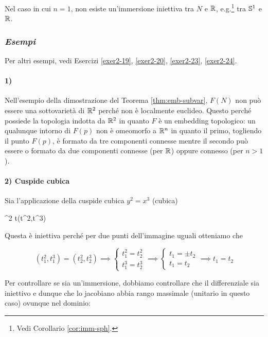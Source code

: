 Nel caso in cui $ n=1 $, non esiste un'immersione iniettiva tra $ N $ e $ \R $, e.g.\footnote{%
	Vedi Corollario \ref{cor:imm-sph}.%
} tra $ \S^{1} $ e $ \R $.

\subsubsection{\textit{Esempi}}

Per altri esempi, vedi Esercizi \ref{exer2-19}, \ref{exer2-20}, \ref{exer2-23}, \ref{exer2-24}.

\paragraph{1)}

Nell'esempio della dimostrazione del Teorema \ref{thm:emb-subvar}, $ F(N) $ non può essere una sottovarietà di $ \R^{2} $ perché non è localmente euclideo. Questo perché possiede la topologia indotta da $ \R^{2} $ in quanto $ F $ è un embedding topologico: un qualunque intorno di $ F(p) $ non è omeomorfo a $ \R^{n} $ in quanto il primo, togliendo il punto $ F(p) $, è formato da tre componenti connesse mentre il secondo può essere o formato da due componenti connesse (per $ \R $) oppure connesso (per $ n > 1 $).

\paragraph{2) Cuspide cubica}

Sia l'applicazione della cuspide cubica $ y^{2} = x^{3} $ (cubica)

	{\R}{\R^{2}}
	{t}{(t^{2},t^{3})}

Questa è iniettiva perché per due punti dell'immagine uguali otteniamo che

\begin{equation}
	(t_{1}^{2},t_{1}^{3}) = (t_{2}^{2},t_{2}^{3}) %
	\implies %
	\begin{cases}
		t_{1}^{2} = t_{2}^{2} \\
		t_{1}^{3} = t_{2}^{3}
	\end{cases} %
	\implies %
	\begin{cases}
		t_{1} = \pm t_{2} \\
		t_{1} = t_{2}
	\end{cases} %
	\implies %
	t_{1} = t_{2}
\end{equation}

Per controllare se sia un'immersione, dobbiamo controllare che il differenziale sia iniettivo e dunque che lo jacobiano abbia rango massimale (unitario in questo caso) ovunque nel dominio:

